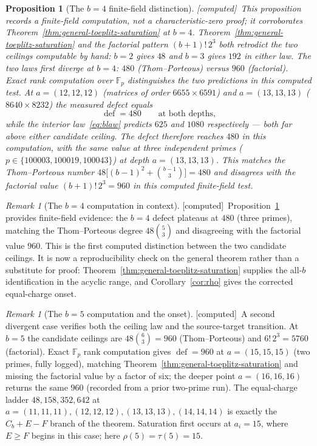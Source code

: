 \documentclass[11pt]{article}
\theoremstyle{plain}
\newtheorem{proposition}[theorem]{Proposition}
\theoremstyle{definition}
\theoremstyle{remark}
\newtheorem{remark}[theorem]{Remark}
\newcommand{\Computed}{\textcolor{Sepia}{\textsf{[computed]}}}
\newcommand{\defect}{\operatorname{def}}
\begin{document}
\begin{proposition}[The $b=4$ finite-field distinction]\label{thm:decisive}
\Computed\ This proposition records a finite-field computation, not a characteristic-zero proof; it corroborates Theorem~\ref{thm:general-toeplitz-saturation} at $b=4$.  Theorem~\ref{thm:general-toeplitz-saturation} and the factorial pattern $(b+1)!\,2^3$ both retrodict the two ceilings computable by hand: $b=2$ gives $48$ and $b=3$ gives $192$ in either law. The two laws first diverge at $b=4$: $480$ (Thom--Porteous) versus $960$ (factorial). Exact rank computation over $\mathbb{F}_p$ distinguishes the two predictions in this computed test. At $a=(12,12,12)$ (matrices of order $6655\times 6591$) and $a=(13,13,13)$ ($8640\times 8232$) the measured defect equals
\[
\defect = 480 \qquad\text{at both depths,}
\]
while the interior law~\eqref{eq:blaw} predicts $625$ and $1080$ respectively --- both far above either candidate ceiling. The defect therefore reaches $480$ in this computation, with the same value at three independent primes ($p\in\{100003,100019,100043\}$) at depth $a=(13,13,13)$. This matches the Thom--Porteous number $48\big[(b-1)^2+\binom{b-1}{3}\big]=480$ and disagrees with the factorial value $(b+1)!\,2^3=960$ in this computed finite-field test.
\end{proposition}

\begin{remark}[The $b=4$ computation in context]\label{rem:decisive}
\Computed\ Proposition~\ref{thm:decisive} provides finite-field evidence: the $b=4$ defect plateaus at $480$ (three primes), matching the Thom--Porteous degree $48\binom{5}{3}$ and disagreeing with the factorial value $960$. This is the first computed distinction between the two candidate ceilings. It is now a reproducibility check on the general theorem rather than a substitute for proof: Theorem~\ref{thm:general-toeplitz-saturation} supplies the all-$b$ identification in the acyclic range, and Corollary~\ref{cor:rho} gives the corrected equal-charge onset.
\end{remark}

\begin{remark}[The $b=5$ computation and the onset]\label{rem:b5}
\Computed\ A second divergent case verifies both the ceiling law and the source-target transition. At $b=5$ the candidate ceilings are $48\binom{6}{3}=960$ (Thom--Porteous) and $6!\,2^3=5760$ (factorial). Exact $\mathbb{F}_p$ rank computation gives $\defect=960$ at $a=(15,15,15)$ (two primes, fully logged), matching Theorem~\ref{thm:general-toeplitz-saturation} and missing the factorial value by a factor of six; the deeper point $a=(16,16,16)$ returns the same $960$ (recorded from a prior two-prime run). The equal-charge ladder $48,158,352,642$ at $a=(11,11,11),(12,12,12),(13,13,13),(14,14,14)$ is exactly the $C_b+E-F$ branch of the theorem. Saturation first occurs at $a_i=15$, where $E\ge F$ begins in this case; here $\rho(5)=\tau(5)=15$.
\end{remark}
\end{document}
